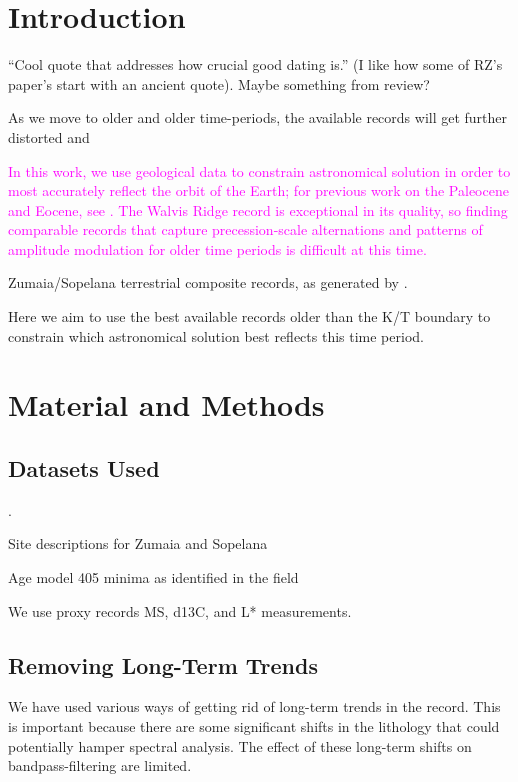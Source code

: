 \documentclass[draft]{agujournal2019}
\newcommand{\rez}{\textcolor{magenta}}
\begin{document}
\section{Introduction}\label{sec:intro}
``Cool quote that addresses how crucial good dating is.'' (I like how some of RZ's paper's start with an ancient quote).
Maybe something from  review?

As we move to older and older time-periods, the available records will get further distorted and

\rez{
In this work, we use geological data to constrain astronomical solution in order to most accurately reflect the orbit of the Earth;
for previous work on the Paleocene and Eocene, see .
The Walvis Ridge record is exceptional in its quality, so finding comparable records that capture precession-scale alternations
and patterns of amplitude modulation for older time periods is difficult at this time.
}

Zumaia/Sopelana terrestrial composite records, as generated by .

Here we aim to use the best available records older than the K/T boundary to constrain which astronomical solution best reflects this time period.



\section{Material and Methods}\label{sec:mm}

\subsection{Datasets Used}\label{sec:data}
.

Site descriptions for Zumaia and Sopelana

Age model \qty{405}{\kiloyear} minima as identified in the field

We use proxy records \gls{MS}, \gls{d13C}, and \gls{L*} measurements.

\subsection{Removing Long-Term Trends}\label{sec:detrend}

We have used various ways of getting rid of long-term trends in the record. This is important because there are some significant shifts in the lithology that could potentially hamper spectral analysis. The effect of these long-term shifts on bandpass-filtering are limited.
\end{document}
